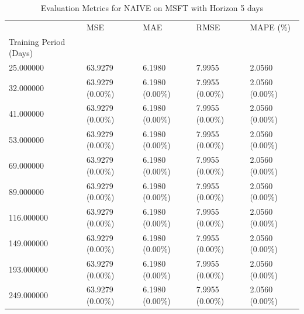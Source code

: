 \begin{table}
\caption{Evaluation Metrics for NAIVE on MSFT with Horizon 5 days}
\label{tab:naive_MSFT_h5_metrics}
\begin{tabular}{lllll}
\toprule
 & MSE & MAE & RMSE & MAPE (\%) \\
Training Period (Days) &  &  &  &  \\
\midrule
25.000000 & 63.9279 & 6.1980 & 7.9955 & 2.0560 \\
32.000000 & 63.9279 (0.00\%) & 6.1980 (0.00\%) & 7.9955 (0.00\%) & 2.0560 (0.00\%) \\
41.000000 & 63.9279 (0.00\%) & 6.1980 (0.00\%) & 7.9955 (0.00\%) & 2.0560 (0.00\%) \\
53.000000 & 63.9279 (0.00\%) & 6.1980 (0.00\%) & 7.9955 (0.00\%) & 2.0560 (0.00\%) \\
69.000000 & 63.9279 (0.00\%) & 6.1980 (0.00\%) & 7.9955 (0.00\%) & 2.0560 (0.00\%) \\
89.000000 & 63.9279 (0.00\%) & 6.1980 (0.00\%) & 7.9955 (0.00\%) & 2.0560 (0.00\%) \\
116.000000 & 63.9279 (0.00\%) & 6.1980 (0.00\%) & 7.9955 (0.00\%) & 2.0560 (0.00\%) \\
149.000000 & 63.9279 (0.00\%) & 6.1980 (0.00\%) & 7.9955 (0.00\%) & 2.0560 (0.00\%) \\
193.000000 & 63.9279 (0.00\%) & 6.1980 (0.00\%) & 7.9955 (0.00\%) & 2.0560 (0.00\%) \\
249.000000 & 63.9279 (0.00\%) & 6.1980 (0.00\%) & 7.9955 (0.00\%) & 2.0560 (0.00\%) \\
\bottomrule
\end{tabular}
\end{table}
